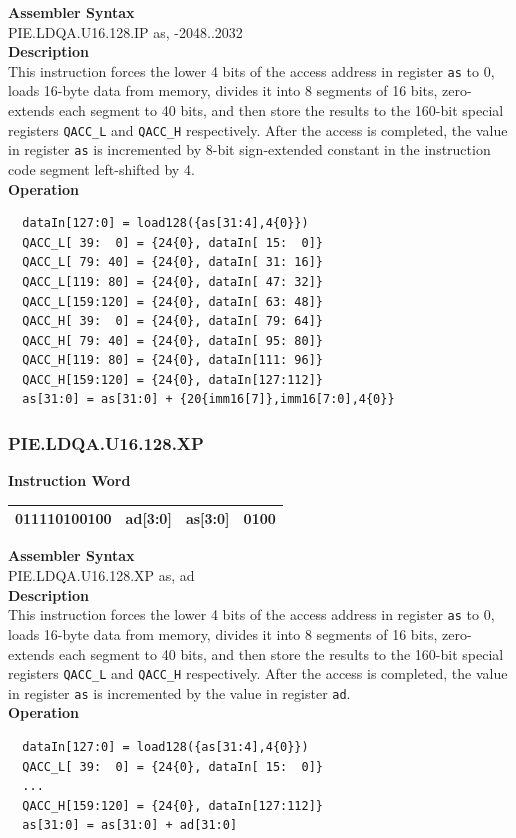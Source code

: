 \textbf{Assembler Syntax} \\
PIE.LDQA.U16.128.IP as, -2048..2032 \\
\textbf{Description} \\
This instruction forces the lower 4 bits of the access address in register \lstinline{as} to 0, loads 16-byte data from memory, divides it into 8 segments of 16 bits, zero-extends each segment to 40 bits, and then store the results to the 160-bit special registers \lstinline{QACC_L} and \lstinline{QACC_H} respectively. After the access is completed, the value in register \lstinline{as} is incremented by 8-bit sign-extended constant in the instruction code segment left-shifted by 4.\\
\textbf{Operation}
\begin{lstlisting}
  dataIn[127:0] = load128({as[31:4],4{0}})
  QACC_L[ 39:  0] = {24{0}, dataIn[ 15:  0]}
  QACC_L[ 79: 40] = {24{0}, dataIn[ 31: 16]}
  QACC_L[119: 80] = {24{0}, dataIn[ 47: 32]}
  QACC_L[159:120] = {24{0}, dataIn[ 63: 48]}
  QACC_H[ 39:  0] = {24{0}, dataIn[ 79: 64]}
  QACC_H[ 79: 40] = {24{0}, dataIn[ 95: 80]}
  QACC_H[119: 80] = {24{0}, dataIn[111: 96]}
  QACC_H[159:120] = {24{0}, dataIn[127:112]}
  as[31:0] = as[31:0] + {20{imm16[7]},imm16[7:0],4{0}}
\end{lstlisting}

\newpage
\subsubsection{PIE.LDQA.U16.128.XP}\label{instruction:PIELDQAU16128XP}
\setlength\tabcolsep{6pt}
\textbf{Instruction Word} \\
\begin{tabular}{|c|c|c|c|}
	\hline
	011110100100 & ad[3:0] & as[3:0] & 0100 \\
	\hline
\end{tabular}

\textbf{Assembler Syntax} \\
PIE.LDQA.U16.128.XP as, ad \\
\textbf{Description} \\
This instruction forces the lower 4 bits of the access address in register \lstinline{as} to 0, loads 16-byte data from memory, divides it into 8 segments of 16 bits, zero-extends each segment to 40 bits, and then store the results to the 160-bit special registers \lstinline{QACC_L} and \lstinline{QACC_H} respectively. After the access is completed, the value in register \lstinline{as} is incremented by the value in register \lstinline{ad}.\\
\textbf{Operation}
\begin{lstlisting}
  dataIn[127:0] = load128({as[31:4],4{0}})
  QACC_L[ 39:  0] = {24{0}, dataIn[ 15:  0]}
  ...
  QACC_H[159:120] = {24{0}, dataIn[127:112]}
  as[31:0] = as[31:0] + ad[31:0]
\end{lstlisting}

